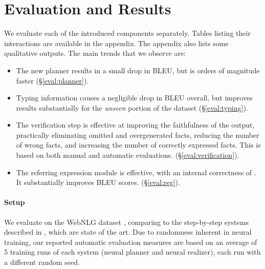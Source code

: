 \section{Evaluation and Results}
We evaluate each of the introduced components separately. Tables listing their interactions are available in the appendix. The appendix also lists some qualitative outputs.
The main trends that we observe are:
\begin{itemize}
    \item The new planner results in a small drop in BLEU, but is orders of magnitude faster (\S\ref{eval:planner}).
    \item Typing information causes a negligible drop in BLEU overall, but improves results substantially for the \emph{unseen} portion of the dataset (\S\ref{eval:typing}).
    \item The verification step is effective at improving the faithfulness of the output, practically eliminating omitted and overgenerated facts, reducing the number of wrong facts, and increasing the number of correctly expressed facts. This is based on both manual and automatic evaluations. (\S\ref{eval:verification}).
    \item The referring expression module is effective, with an internal correctness of . It substantially improves BLEU scores. (\S\ref{eval:reg}).
\end{itemize}


\paragraph{Setup} We evaluate on the WebNLG dataset \cite{colin2016webnlg}, comparing to the step-by-step systems described in \citet{step-by-step}, which are state of the art. Due to randomness inherent in neural training, our reported automatic evaluation measures are based on an average of 5 training runs of each system (neural planner and neural realizer), each run with a different random seed. 


